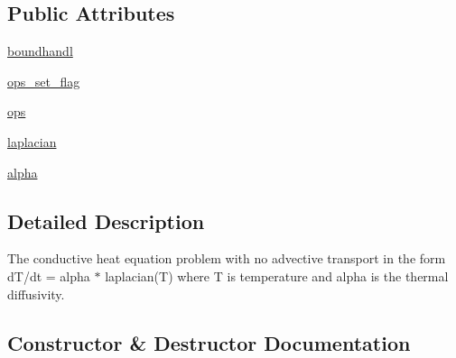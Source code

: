 \subsection*{Public Attributes}
\begin{DoxyCompactItemize}
\item 
\hyperlink{classMain__PDE__Repo_1_1src_1_1conduct__heat__eqn_1_1ConductHeatEqn_ad02498e5299e7a1d34f9f8ef1460fddd}{boundhandl}
\item 
\hyperlink{classMain__PDE__Repo_1_1src_1_1conduct__heat__eqn_1_1ConductHeatEqn_ab59c6cb80b17b0e0b17e64dffc341ec5}{ops\+\_\+set\+\_\+flag}
\item 
\hyperlink{classMain__PDE__Repo_1_1src_1_1conduct__heat__eqn_1_1ConductHeatEqn_a37601e4988c38b8a9a7f5d60867b528c}{ops}
\item 
\hyperlink{classMain__PDE__Repo_1_1src_1_1conduct__heat__eqn_1_1ConductHeatEqn_a3db974e4df85f88ce996026771f915cc}{laplacian}
\item 
\hyperlink{classMain__PDE__Repo_1_1src_1_1conduct__heat__eqn_1_1ConductHeatEqn_abd7a28d699a29f455f2be1c6a8620345}{alpha}
\end{DoxyCompactItemize}


\subsection{Detailed Description}
The conductive heat equation problem with no advective transport in the form d\+T/dt = alpha $\ast$ laplacian(\+T) where T is temperature and alpha is the thermal diffusivity. 



\subsection{Constructor \& Destructor Documentation}
\mbox{\label{classMain__PDE__Repo_1_1src_1_1conduct__heat__eqn_1_1ConductHeatEqn_a633aec4538eca3787158fad099fc325e}} 

